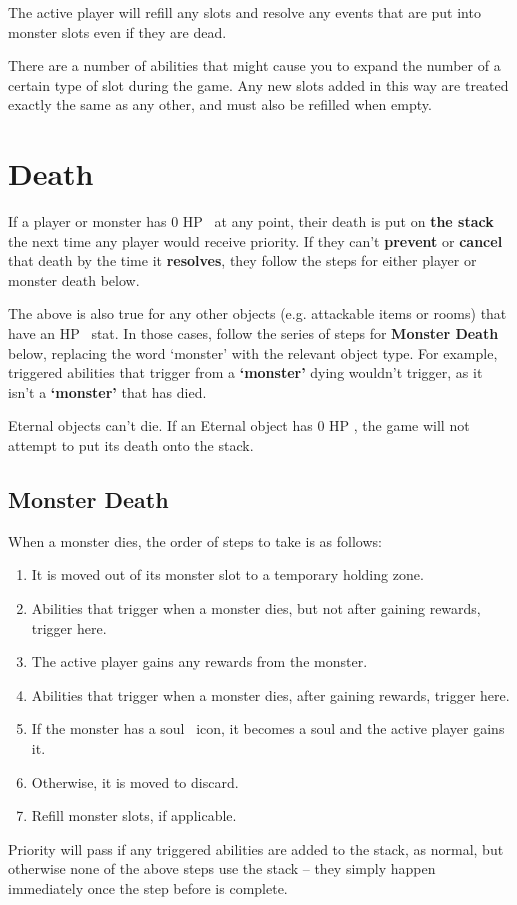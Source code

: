 \documentclass[
  fontsize=10pt,
  paper=a5,
  version=last,
  chapterprefix=true,
  bindingoffset=5mm,
  ]{scrbook}
\newcommand*{\inlineicon}[1]{%
    \raisebox{-.3\baselineskip}{%
        \smash{%
            \texttt{[image: \#1]}%
        }%
    }%
}
\newcommand{\heart}{\inlineicon{./assets/ms-heart.png}}
\newcommand{\soul}{\inlineicon{./assets/ms-soul.png}}
\begin{document}
    The active player will refill any slots and resolve any events that are put into monster slots even if they are dead.

    There are a number of abilities that might cause you to expand the number of a certain type of slot during the game. Any new slots added in this way are treated exactly the same as any other, and must also be refilled when empty.

    \chapter{Death}
    \label{death}
    If a player or monster has 0 HP\heart\ at any point, their death is put on \textbf{the stack} the next time any player would receive priority. If they can’t \textbf{prevent} or \textbf{cancel} that death by the time it \textbf{resolves}, they follow the steps for either player or monster death below.

    The above is also true for any other objects (e.g. attackable items or rooms) that have an HP\heart\ stat. In those cases, follow the series of steps for \textbf{Monster Death} below, replacing the word ‘monster’ with the relevant object type. For example, triggered abilities that trigger from a \textbf{‘monster’} dying wouldn’t trigger, as it isn’t a \textbf{‘monster’} that has died.

    Eternal objects can’t die. If an Eternal object has 0 HP\heart, the game will not attempt to put its death onto the stack.

    \section{Monster Death}
    \label{monsterdeath}
    When a monster dies, the order of steps to take is as follows:
    \begin{enumerate}
        \item It is moved out of its monster slot to a temporary holding zone.
        \item Abilities that trigger when a monster dies, but not after gaining rewards, trigger here.
        \item The active player gains any rewards from the monster.
        \item Abilities that trigger when a monster dies, after gaining rewards, trigger here.
        \item If the monster has a soul\soul\ icon, it becomes a soul and the active player gains it. 
        \item Otherwise, it is moved to discard.
        \item Refill monster slots, if applicable.
    \end{enumerate}
    Priority will pass if any triggered abilities are added to the stack, as normal, but otherwise none of the above steps use the stack – they simply happen immediately once the step before is complete.
\end{document}
